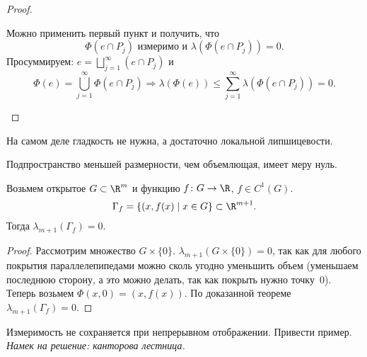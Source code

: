 \begin{proof}
\begin{description}
\begin{enumerate}
					Можно применить первый пункт и получить, что
					\[
						\Phi (e \cap P_j) \text{ измеримо и }  \lambda (\Phi (e \cap P_j)) = 0
					.\]
					Просуммируем:
					$
					e = \bigsqcup_{j=1}^{\infty} (e \cap P_j)
					$ и
					\[
						\Phi (e) = \bigcup_{j=1}^{\infty} \Phi (e \cap P_j) \Longrightarrow \lambda (\Phi (e)) \le  \sum_{j=1}^{\infty} \lambda (\Phi (e \cap P_j)) = 0
					.\]
			\end{enumerate}
	\end{description}
\end{proof}
\begin{rem}
	На самом деле гладкость не нужна, а достаточно локальной липшицевости.
\end{rem}
\begin{rem}
	Подпространство меньшей размерности, чем объемлющая, имеет меру нуль.
\end{rem}
\begin{cor}
	Возьмем открытое $ G \subset \R^{m} $ и функцию $ f\colon G \to \R$, $ f \in C^{1}(G)$. \[
		\Gamma _{f} = \{(x, f(x) \mid x \in G\} \subset \R^{m+1}
	.\]
	Тогда $ \lambda _{m+1}(\Gamma _f) = 0$.
\end{cor}
\begin{proof}
	Рассмотрим множество $ G\times \{0\} $. $ \lambda _{m+1}(G \times \{0\}) = 0$, так как для любого покрытия параллелепипедами можно сколь угодно уменьшить объем (уменьшаем последнюю сторону, а это можно делать, так как покрыть нужно точку~$ 0$). Теперь возьмем $ \Phi (x, 0) = (x, f(x))$.
	По доказанной теореме $ \lambda _{m+1}(\Gamma _{f}) = 0$.
\end{proof}
\begin{probl}
	Измеримость не сохраняется при непрерывном отображении. Привести пример. \textit{Намек на решение: канторова лестница.}
\end{probl}

		\fontAwesomeSymbol{\faRa}

